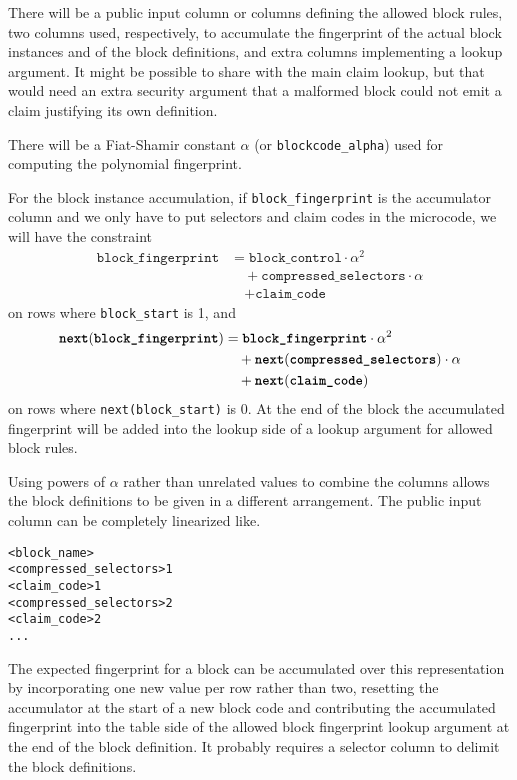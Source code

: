 \documentclass{article}
\theoremstyle{plain}
\theoremstyle{definition}
\begin{document}
There will be a public input column or columns defining the allowed
block rules, two columns used, respectively, to accumulate the fingerprint
of the actual block instances and of the block definitions, and extra
columns implementing a lookup argument. It might be possible to share
with the main claim lookup, but that would need an extra security
argument that a malformed block could not emit a claim justifying its own
definition.

There will be a Fiat-Shamir constant \(\alpha\) (or
\texttt{blockcode\_alpha}) used for computing the polynomial
fingerprint.

For the block instance accumulation, if \texttt{block\_fingerprint} is
the accumulator column and we only have to put selectors and claim codes
in the microcode, we will have the constraint
\begin{align*}
\texttt{block\_fingerprint} & = \texttt{block\_control} \cdot \alpha^2 \\
& \quad + \texttt{compressed\_selectors} \cdot \alpha \\
& \quad + \texttt{claim\_code}
\end{align*}
on rows where \texttt{block\_start} is 1, and
\begin{align*}
\texttt{\textbf{next}}(\texttt{\textbf{block\_fingerprint}}) &= \texttt{\textbf{block\_fingerprint}} \cdot \alpha^2 \\
&\quad + \texttt{\textbf{next}}(\texttt{\textbf{compressed\_selectors}}) \cdot \alpha \\
&\quad + \texttt{\textbf{next}}(\texttt{\textbf{claim\_code}}) \\
\end{align*}
on rows where \texttt{next(block\_start)} is 0.
At the end of the block the accumulated fingerprint will be added into
the lookup side of a lookup argument for allowed block rules.

Using powers of \(\alpha\) rather than unrelated values to combine the
columns allows the block definitions to be given in a different
arrangement. The public input column can be completely linearized like.

\begin{verbatim}
<block_name>
<compressed_selectors>1
<claim_code>1
<compressed_selectors>2
<claim_code>2
...
\end{verbatim}

The expected fingerprint for a block can be accumulated over this
representation by incorporating one new value per row rather than two,
resetting the accumulator at the start of a new block code and contributing
the accumulated fingerprint into the table side of the allowed block
fingerprint lookup argument at the end of the block definition.
It probably requires a selector column to delimit the block definitions.
\end{document}
